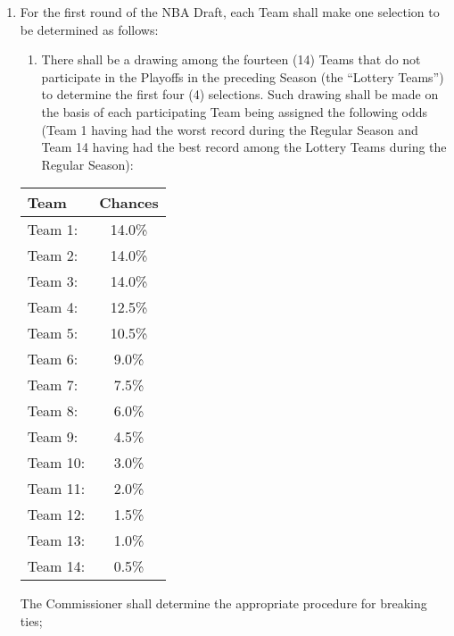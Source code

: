 \documentclass[]{book}
\providecommand{\tightlist}{%
  \setlength{\itemsep}{0pt}\setlength{\parskip}{0pt}}
\begin{document}
\begin{enumerate}
\def\labelenumi{(\alph{enumi})}
\tightlist
\item
  For the first round of the NBA Draft, each Team shall make one selection to be determined as follows:

  \begin{enumerate}
  \def\labelenumii{(\roman{enumii})}
  \tightlist
  \item
    There shall be a drawing among the fourteen (14) Teams that do not participate in the Playoffs in the preceding Season (the ``Lottery Teams'') to determine the first four (4) selections. Such drawing shall be made on the basis of each participating Team being assigned the following odds (Team 1 having had the worst record during the Regular Season and Team 14 having had the best record among the Lottery Teams during the Regular Season):
  \end{enumerate}

  \begin{longtable}[]{@{}lc@{}}
  \toprule
  Team & Chances\tabularnewline
  \midrule
  \endhead
  Team 1: & 14.0\%\tabularnewline
  Team 2: & 14.0\%\tabularnewline
  Team 3: & 14.0\%\tabularnewline
  Team 4: & 12.5\%\tabularnewline
  Team 5: & 10.5\%\tabularnewline
  Team 6: & 9.0\%\tabularnewline
  Team 7: & 7.5\%\tabularnewline
  Team 8: & 6.0\%\tabularnewline
  Team 9: & 4.5\%\tabularnewline
  Team 10: & 3.0\%\tabularnewline
  Team 11: & 2.0\%\tabularnewline
  Team 12: & 1.5\%\tabularnewline
  Team 13: & 1.0\%\tabularnewline
  Team 14: & 0.5\%\tabularnewline
  \bottomrule
  \end{longtable}

  The Commissioner shall determine the appropriate procedure for breaking ties;


\end{enumerate}
\end{document}
